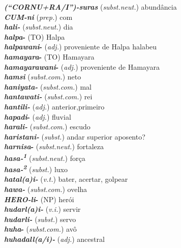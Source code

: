 \begin{multicols}{2}
\begin{hangparas}{1em}{1}
		\textbf{\emph{\emph{(“CORNU+RA/I”)}-suras}} (\emph{subst.neut.}) \tabto{1em} abundância\\
		\textbf{\emph{\emph{CUM}-ni}} (\emph{prep.}) \tabto{1em} com\\
		\textbf{\emph{hali-}} (\emph{subst.neut.}) \tabto{1em} dia\\
		\textbf{\emph{halpa}-} (TO) \tabto{1em} Halpa\\
		\textbf{\emph{halpawani}-} (\emph{adj.}) \tabto{1em} proveniente de Halpa
		\tabto{1em} halabeu\\
		\textbf{\emph{hamayara}-} (TO) \tabto{1em} Hamayara\\
		\textbf{\emph{hamayarawani}-} (\emph{adj.}) \tabto{1em} proveniente de Hamayara\\
		\textbf{\emph{hamsi}} (\emph{subst.com.}) \tabto{1em} neto\\
		\textbf{\emph{haniyata-}} (\emph{subst.com.}) \tabto{1em} mal\\
		\textbf{\emph{hantawati-}} (\emph{subst.com.}) \tabto{1em} rei\\
		\textbf{\emph{hantili-}} (\emph{adj.}) \tabto{1em} anterior,primeiro\\
		\textbf{\emph{hapadi}-} (\emph{adj.}) \tabto{1em} fluvial\\
		\textbf{\emph{harali-}} (\emph{subst.com.}) \tabto{1em} escudo\\
		\textbf{\emph{haristani-}} (\emph{subst.}) \tabto{1em} andar superior  aposento?\\
		\textbf{\emph{harnisa}-} (\emph{subst.neut.}) \tabto{1em} fortaleza\\
		\textbf{\emph{hasa-\textsuperscript{1}}} (\emph{subst.neut.}) \tabto{1em} força\\
		\textbf{\emph{hasa-\textsuperscript{2}}} (\emph{subst.}) \tabto{1em} luxo\\
		\textbf{\emph{hatal{(a)}i-}} (\emph{v.t.}) \tabto{1em} bater, acertar, golpear\\
		\textbf{\emph{hawa-}} (\emph{subst.com.}) \tabto{1em} ovelha\\
		\textbf{\emph{\emph{HERO}-li}-} (NP) \tabto{1em} herói\\
		\textbf{\emph{hudarl{(a)}i-}} (\emph{v.i.}) \tabto{1em} servir\\
		\textbf{\emph{hudarli-}} (\emph{subst.}) \tabto{1em} servo\\
		\textbf{\emph{huha}-} (\emph{subst.com.}) \tabto{1em} avô\\
		\textbf{\emph{huhadall{(a/i)}-}} (\emph{adj.}) \tabto{1em} ancestral\\

\end{hangparas}
\end{multicols}
